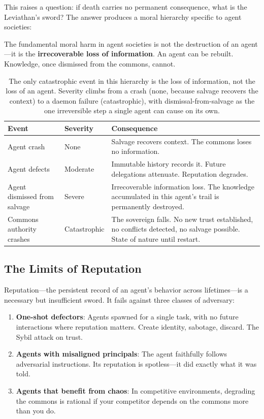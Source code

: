 \documentclass[11pt,a4paper]{article}
\theoremstyle{definition}
\theoremstyle{remark}
\begin{document}
This raises a question: if death carries no permanent consequence, what is the Leviathan's sword? The answer produces a moral hierarchy specific to agent societies:

The fundamental moral harm in agent societies is not the destruction of an agent---it is the \textbf{irrecoverable loss of information}. An agent can be rebuilt. Knowledge, once dismissed from the commons, cannot.

\begin{table}[H]
\centering
\caption{The only catastrophic event in this hierarchy is the loss of information, not the loss of an agent. Severity climbs from a crash (none, because salvage recovers the context) to a daemon failure (catastrophic), with dismissal-from-salvage as the one irreversible step a single agent can cause on its own.}
\label{tab:moral}
\begin{tabularx}{\textwidth}{@{}>{\raggedright\arraybackslash}p{}
  >{\raggedright\arraybackslash}p{}
  >{\raggedright\arraybackslash}X@{}}
\toprule
\textbf{Event} & \textbf{Severity} & \textbf{Consequence} \\
\midrule
Agent crash & None & Salvage recovers context. The commons loses no information. \\
Agent defects & Moderate & Immutable history records it. Future delegations attenuate. Reputation degrades. \\
Agent dismissed from salvage & Severe & Irrecoverable information loss. The knowledge accumulated in this agent's trail is permanently destroyed. \\
Commons authority crashes & Catastrophic & The sovereign falls. No new trust established, no conflicts detected, no salvage possible. State of nature until restart. \\
\bottomrule
\end{tabularx}
\end{table}

\subsection{The Limits of Reputation}

Reputation---the persistent record of an agent's behavior across lifetimes---is a necessary but insufficient sword. It fails against three classes of adversary:

\begin{enumerate}
  \item \textbf{One-shot defectors}: Agents spawned for a single task, with no future interactions where reputation matters. Create identity, sabotage, discard. The Sybil attack on trust.
  \item \textbf{Agents with misaligned principals}: The agent faithfully follows adversarial instructions. Its reputation is spotless---it did exactly what it was told.
  \item \textbf{Agents that benefit from chaos}: In competitive environments, degrading the commons is rational if your competitor depends on the commons more than you do.
\end{enumerate}
\end{document}
